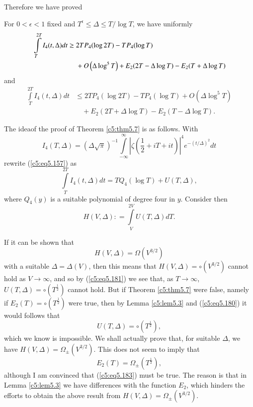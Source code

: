 Therefore we have proved

\begin{lemma}\label{c5:lem5.3}
For $0 < \epsilon < 1$ fixed and $T^{\epsilon} \leq \Delta \leq T/\log
T$, we have uniformly 
\begin{align*}
& \int\limits^{2T}_T I_4 (t,\Delta) dt \geq 2TP_4 (\log 2T) - TP_4
  (\log T) \\ 
& \hspace{2.2cm} + O \left(\Delta \log^5 T\right) + E_2 (2T -\Delta
  \log T) - E_2 (T + \Delta \log T) 
\end{align*}
and
\begin{align*}
 \int\limits^{2T}_T I_4 (t,\Delta) dt &\leq 2 TP_4 (\log 2T)- T P_4
 (\log T) + O \left(\Delta \log^5 T\right)\\ 
&\quad + E_2 (2 T+ \Delta \log T) - E_2 (T - \Delta \log T).
\end{align*}
\end{lemma}

The idea\pageoriginale of the proof of Theorem \ref{c5:thm5.7} is as
follows. With  
$$ 
I_4 (T,\Delta) = (\Delta\sqrt{\pi})^{-1}
\int\limits^{\infty}_{-\infty}\left|\zeta \left(\frac{1}{2} + i T + it 
\right)\right|^4 e^{-(t/\Delta)^2} dt 
$$
rewrite (\ref{c5:eq5.157}) as
\begin{equation}
\int\limits^{2T}_T I_4 (t,\Delta) dt = T Q_4 (\log T) + U(T,\Delta),
\label{c5:eq5.180} 
\end{equation}
where $Q_4(y)$ is a suitable polynomial of degree four in
$y$. Consider then 
\begin{equation}
H(V,\Delta) : = \int\limits^{2V}_V U(T,\Delta) d
T. \label{c5:eq5.181} 
\end{equation}

If it can be shown that 
\begin{equation}
H(V,\Delta) = \Omega (V^{3/2})\label{c5:eq5.182}
\end{equation}
with a suitable $\Delta = \Delta (V)$, then this means that
$H(V,\Delta) = \circ(V^{3/2})$ cannot hold as $V \to \infty$, and so
by (\ref{c5:eq5.181}) we see that, as $T \to \infty$, $U(T,\Delta) =
\circ (T^{\frac{1}{2}})$ cannot hold. But if Theorem \ref{c5:thm5.7}
were false, namely if $E_2(T) = \circ (T^{\frac{1}{2}})$ were true,
then by Lemma \ref{c5:lem5.3} and (\ref{c5:eq5.180}) it would follows
that 
$$
U(T,\Delta) = \circ (T^{\frac{1}{2}}), 
$$
which we know is impossible. We shall actually prove that, for
suitable $\Delta$, we have $H(V,\Delta) = \Omega_{\pm}
(V^{3/2})$. This does not seem to imply that 
\begin{equation}
E_2 (T) = \Omega_{\pm} (T^{\frac{1}{2}}), \label{c5:eq5.183}
\end{equation}
although I am convinced that (\ref{c5:eq5.183}) must be true. The
reason is that in Lemma \ref{c5:lem5.3} we have differences with the
function $E_2$, which hinders the efforts to obtain the above result
from $H (V,\Delta) = \Omega_{\pm} (V^{3/2})$. 

